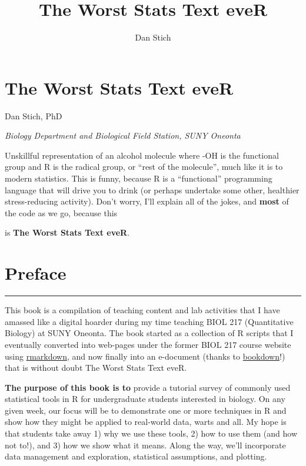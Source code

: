 \documentclass[
]{book}
\title{The Worst Stats Text eveR}
\author{Dan Stich}
\date{}
\begin{document}
\maketitle

{
\setcounter{tocdepth}{1}
\tableofcontents
}
\hypertarget{title}{%
\chapter*{The Worst Stats Text eveR}\label{title}}

Dan Stich, PhD

\emph{Biology Department and Biological Field Station, SUNY Oneonta}

Unskillful representation of an alcohol molecule where -OH is the functional group and R is the radical group, or ``rest of the molecule'', much like it is to modern statistics. This is funny, because R is a ``functional'' programming language that will drive you to drink (or perhaps undertake some other, healthier stress-reducing activity). Don't worry, I'll explain all of the jokes, and \textbf{most} of the code as we go, because this

is \textbf{The Worst Stats Text eveR}.

\hypertarget{preface}{%
\chapter*{Preface}\label{preface}}

\begin{center}\rule{0.5\linewidth}{0.5pt}\end{center}

This book is a compilation of teaching content and lab activities that I have amassed like a digital hoarder during my time teaching BIOL 217 (Quantitative Biology) at SUNY Oneonta. The book started as a collection of R scripts that I eventually converted into web-pages under the former BIOL 217 course website using \href{https://rmarkdown.rstudio.com/}{rmarkdown}, and now finally into an e-document (thanks to \href{https://bookdown.org/home/about/}{bookdown}!) that is without doubt The Worst Stats Text eveR.

\textbf{The purpose of this book is to} provide a tutorial survey of commonly used statistical tools in R for undergraduate students interested in biology. On any given week, our focus will be to demonstrate one or more techniques in R and show how they might be applied to real-world data, warts and all. My hope is that students take away 1) why we use these tools, 2) how to use them (and how not to!), and 3) how we show what it means. Along the way, we'll incorporate data management and exploration, statistical assumptions, and plotting.
\end{document}
